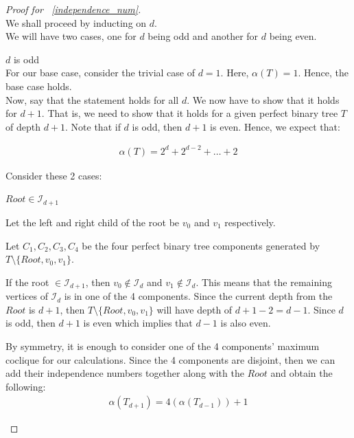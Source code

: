 \documentclass{amsart}
\theoremstyle{definition}
\begin{document}
\begin{proof}[Proof for ~\ref{independence_num}]
	$ $ \\
	We shall proceed by inducting on $d$.\\
	We will have two cases, one for $d$ being odd and another for $d$ being even.
	\begin{caseof}
		\item $d$ is odd \\

		For our base case, consider the trivial case of $d = 1$. Here, $\alpha(T) = 1$. Hence, the base case holds. \\

		Now, say that the statement holds for all $d$. We now have to show that it holds for $d+1$. That is, we need to show that it holds for a given perfect binary tree $T$ of depth $d + 1$. Note that if $d$ is odd, then $d + 1$ is even. Hence, we expect that:

		\begin{align*}
			\alpha(T) = 2^d + 2^{d - 2} + \ldots + 2 
		\end{align*}

		Consider these 2 cases:

		\begin{subcaseof}
			\item $Root \in \mathcal{I}_{d + 1}$

			Let the left and right child of the root be $v_0$ and $v_1$ respectively.

			Let $C_1, C_2, C_3, C_4$ be the four perfect binary tree components generated by $T \setminus \{Root, v_0, v_1\}$.

			If the root $\in \mathcal{I}_{d + 1}$, then $v_0 \not\in \mathcal{I}_d$ and $v_1 \not\in \mathcal{I}_d$. This means that the remaining vertices of $\mathcal{I}_d$ is in one of the 4 components.
			Since the current depth from the $Root$ is $d + 1$, then $T \setminus \{Root, v_0, v_1\}$ will have depth of $d + 1 - 2 = d - 1$. Since $d$ is odd, then $d + 1$ is even which implies that $d - 1$ is also even.

			By symmetry, it is enough to consider one of the 4 components' maximum coclique for our calculations. Since the 4 components are disjoint, then we can add their independence numbers together along with the $Root$ and obtain the following:
			\begin{align*}
				\alpha(T_{d + 1}) = 4(\alpha(T_{d - 1})) + 1
			\end{align*}


\end{subcaseof}
\end{caseof}
\end{proof}
\end{document}
